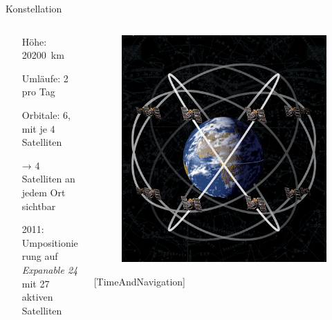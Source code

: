 \begin{frame}{Konstellation}
    \begin{columns}
        \begin{column}{0.5\textwidth}
            \begin{itemize}
                \item[Höhe:] \SI{20200}{\kilo\meter}
                \item[Umläufe:] 2 pro Tag
                \item[Orbitale:] 6, mit je 4 Satelliten
                \item[→] 4 Satelliten an jedem Ort sichtbar
                \item[2011:] Umpositionierung auf \textit{Expanable 24}\\mit 27 aktiven Satelliten
            \end{itemize}
        \end{column}
        \begin{column}{0.3\textwidth}
            \begin{figure}
                \centering
                \includegraphics[width=\textwidth]{images/satelliten_schaubild.jpg}
            \end{figure}
            {\small [TimeAndNavigation]}
        \end{column}
    \end{columns}
\end{frame}

